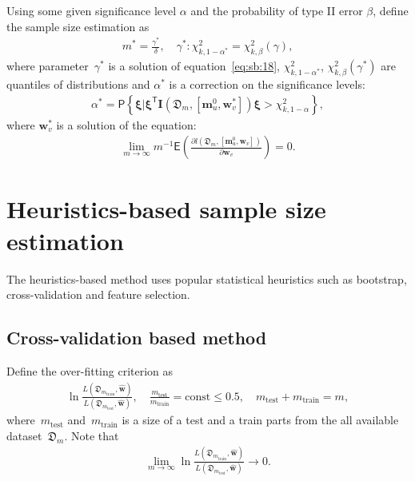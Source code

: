 \documentclass[
11pt,%
tightenlines,%
twoside,%
onecolumn,%
nofloats,%
nobibnotes,%
nofootinbib,%
superscriptaddress,%
noshowpacs,%
centertags]%
{revtex4}
\begin{document}
Using some given significance level $\alpha$ and the probability of type II error $\beta$, define the sample size estimation as
\[
\label{eq:sb:18}
\begin{aligned}
	m^* = \frac{\gamma^*}{\delta}, \quad \gamma^*:\chi^2_{k, 1-\alpha^{*}} = \chi^2_{k, \beta}\left(\gamma\right),
\end{aligned}
\]
where parameter~$\gamma^*$ is a solution of equation~\eqref{eq:sb:18}, $\chi^2_{k, 1-\alpha^*}$, $\chi^2_{k, \beta}\left(\gamma^*\right)$ are quantiles of distributions and $\alpha^*$ is a correction on the significance levels:
\[
\label{eq:sb:19}
\begin{aligned}
	\alpha^* = \mathsf{P}\left\{\bm{\xi} | \bm{\xi}^{\mathsf{T}}\textbf{I}\left(\mathfrak{D}_m, \left[\textbf{m}_{u}^{0}, \textbf{w}^{*}_v\right]\right)\bm{\xi} > \chi^2_{k,1 - \alpha}\right\},
\end{aligned}
\]
where $\textbf{w}^{*}_v$  is a solution of the equation:
\[
\label{eq:sb:20}
\begin{aligned}
	\lim_{m\to\infty}m^{-1}\mathsf{E}\left(\frac{\partial l\left(\mathfrak{D}_m, \left[ \textbf{m}_{u}^{0}, \textbf{w}_{v}\right]\right)}{\partial \textbf{w}_{v}}\right) = 0.
\end{aligned}
\]

\section{Heuristics-based sample size estimation}
The heuristics-based method uses popular statistical heuristics such as bootstrap, cross-validation and feature selection.
    
\subsection{Cross-validation based method}
Define the over-fitting criterion as
\[
\label{eq:hb:5}
\begin{aligned}
	\ln\frac{L(\mathfrak{D}_{m_{\text{train}}}, \hat{\textbf{w}})}{L(\mathfrak{D}_{m_{\text{test}}}, \hat{\textbf{w}})}, \quad \frac{m_{\text{test}}}{m_{\text{train}}} = \text{const} \leq 0.5, \quad m_{\text{test}} + m_{\text{train}} = m,
\end{aligned}
\]
where~$m_{\text{test}}$ and~$m_{\text{train}}$ is a size of a test and a train parts from the all available dataset~$\mathfrak{D}_{m}$.
Note that 
\[
\label{eq:hb:6}
\begin{aligned}
	\lim_{m\to \infty}\ln\frac{L(\mathfrak{D}_{m_{\text{train}}}, \hat{\textbf{w}})}{L(\mathfrak{D}_{m_{\text{test}}}, \hat{\textbf{w}})} \to 0.
\end{aligned}
\]
\end{document}
